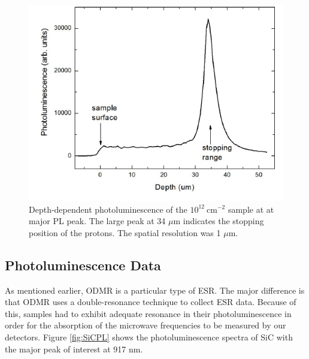 \documentclass[oneside, noacknowlegments]{BYUPhys}
\begin{document}
\begin{figure}
    \centerline{\includegraphics{srim_fig}}
    \caption[SiC Depth-Dependent Photoluminescence]{\label{fig:SiCDepth}
     Depth-dependent photoluminescence of the $10^{12}~\text{cm}^{−2}$ sample at at major PL peak. The large peak at 34 $\mu$m indicates the stopping position of the protons. The spatial resolution was 1 $\mu$m.}
 \end{figure}

\subsection{Photoluminescence Data}

As mentioned earlier, ODMR is a particular type of ESR. The major difference is that ODMR uses a double-resonance technique to collect ESR data. Because of this, samples had to exhibit adequate resonance in their photoluminescence in order for the absorption of the microwave frequencies to be measured by our detectors. Figure \ref{fig:SiCPL} shows the photoluminescence spectra of SiC with the major peak of interest at 917 nm.
\end{document}
